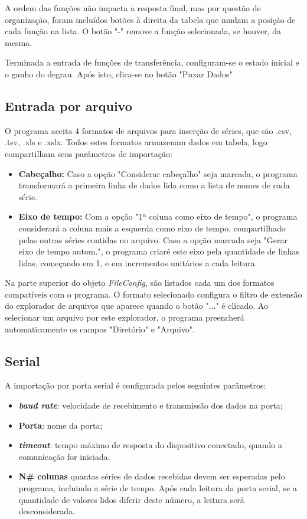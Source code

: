 A ordem das funções não impacta a resposta final, mas por questão de organização, foram incluídos botões à direita da tabela que mudam a posição de cada função na lista. O botão "-" remove a função selecionada, se houver, da mesma.

Terminada a entrada de funções de transferência, configuram-se o estado inicial e o ganho do degrau. Após isto, clica-se no botão "Puxar Dados"

\subsection{Entrada por arquivo}

O programa aceita 4 formatos de arquivos para inserção de séries, que são .csv, .tsv, .xls e .xslx. Todos estes formatos armazenam dados em tabela, logo compartilham seus parâmetros de importação:

\begin{itemize}
	\item \textbf{Cabeçalho:} Caso a opção "Considerar cabeçalho" seja marcada, o programa transformará a primeira linha de dados lida como a lista de nomes de cada série.
	\item \textbf{Eixo de tempo:} Com a opção "1ª coluna como eixo de tempo", o programa considerará a coluna mais a esquerda como eixo de tempo, compartilhado pelas outras séries contidas no arquivo. Caso a opção marcada seja "Gerar eixo de tempo autom.", o programa criaré este eixo pela quantidade de linhas lidas, começando em 1, e em incrementos unitários a cada leitura.
\end{itemize}

Na parte superior do objeto \emph{FileConfig}, são listados cada um dos formatos compatíveis com o programa. O formato selecionado configura o filtro de extensão do explorador de arquivos que aparece quando o botão "..." é clicado. Ao selecionar um arquivo por este explorador, o programa preencherá automaticamente os campos "Diretório" e "Arquivo".

\subsection{Serial}

A importação por porta serial é configurada pelos seguintes parâmetros:

\begin{itemize}
	\item \textbf{\emph{baud rate}}: velocidade de recebimento e transmissão dos dados na porta;
	\item \textbf{Porta}: nome da porta;
	\item \textbf{\emph{timeout}}: tempo máximo de resposta do dispositivo conectado, quando a comunicação for iniciada.
	\item \textbf{N\# colunas} quantas séries de dados recebidas devem ser esperadas pelo programa, incluindo a série de tempo. Após cada leitura da porta serial, se a quantidade de valores lidos diferir deste número, a leitura será desconsiderada.
\end{itemize}

